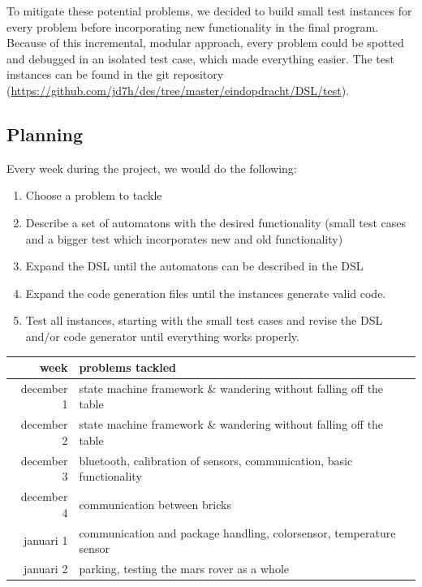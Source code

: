 \documentclass[11pt,a4paper]{article}
\begin{document}
To mitigate these potential problems, we decided to build small test instances for every problem before incorporating new functionality in the final program. Because of this incremental, modular approach, every problem could be spotted and debugged in an isolated test case, which made everything easier. The test instances can be found in the git repository (\url{https://github.com/jd7h/des/tree/master/eindopdracht/DSL/test}). 

\subsection{Planning}
Every week during the project, we would do the following:
\begin{enumerate}
\item Choose a problem to tackle
\item Describe a set of automatons with the desired functionality (small test cases and a bigger test which incorporates new and old functionality)
\item Expand the DSL until the automatons can be described in the DSL
\item Expand the code generation files until the instances generate valid code.
\item Test all instances, starting with the small test cases and revise the DSL and/or code generator until everything works properly. 
\end{enumerate}

\begin{tabular}{|r|p{10cm}|}
\hline
week & problems tackled\\
\hline
december 1	& state machine framework \& wandering without falling off the table\\
december 2	& state machine framework \& wandering without falling off the table\\
december 3	& bluetooth, calibration of sensors, communication, basic functionality\\
december 4	& communication between bricks\\\hline
januari 1	& communication and package handling, colorsensor, temperature sensor\\
januari 2	& parking, testing the mars rover as a whole\\
\hline
\end{tabular}


\end{document}
